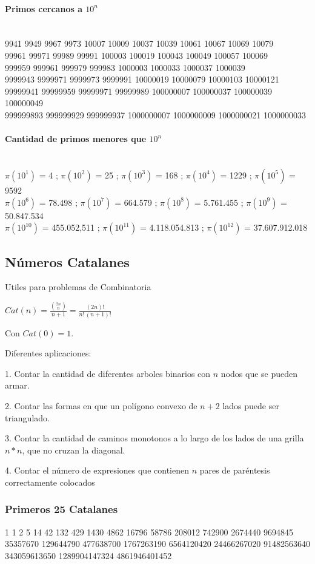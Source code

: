 \paragraph{Primos cercanos a $10^n$}\ \\
9941 9949 9967 9973 10007 10009 10037 10039 10061 10067 10069 10079\\
99961 99971 99989 99991 100003 100019 100043 100049 100057 100069\\
999959 999961 999979 999983 1000003 1000033 1000037 1000039\\
9999943 9999971 9999973 9999991 10000019 10000079 10000103 10000121\\
99999941 99999959 99999971 99999989 100000007 100000037 100000039 100000049\\
999999893 999999929 999999937 1000000007 1000000009 1000000021 1000000033
 
\paragraph{Cantidad de primos menores que $10^n$}\ \\
$\pi(10^1)$ = 4 ;
$\pi(10^2)$ = 25 ;
$\pi(10^3)$ = 168 ;
$\pi(10^4)$ = 1229 ;
$\pi(10^5)$ = 9592 \\
$\pi(10^6)$ = 78.498 ;
$\pi(10^7)$ = 664.579 ;
$\pi(10^8)$ = 5.761.455 ;
$\pi(10^9)$ = 50.847.534 \\
$\pi(10^{10})$ = 455.052,511 ;
$\pi(10^{11})$ = 4.118.054.813 ;
$\pi(10^{12})$ = 37.607.912.018%
%
%
%

\subsection{N\'umeros Catalanes}
Utiles para problemas de Combinatoria


$Cat(n)=\frac{\binom{2n}{n}}{n+1} =\frac{(2n)!}{n!\,(n+1)!}$

Con $Cat(0)=1$.
\begin{flushleft}
Diferentes aplicaciones:

1. Contar la cantidad de diferentes arboles binarios con $n$ nodos que se pueden armar.

2. Contar las formas en que un pol\'igono convexo de $n+2$ lados puede ser triangulado.

3. Contar la cantidad de caminos monotonos a lo largo de los lados de una grilla $n*n$, que no cruzan la diagonal.

4. Contar el n\'umero de expresiones que contienen $n$ pares de par\'entesis correctamente colocados
\end{flushleft}

\subsubsection{Primeros 25 Catalanes}

\begin{flushleft}
1 1 2 5 14 42 132 429 1430 4862 16796 58786 208012 742900 2674440 
9694845 35357670 129644790 477638700 1767263190 6564120420
24466267020 91482563640 343059613650 1289904147324 4861946401452
\end{flushleft}
